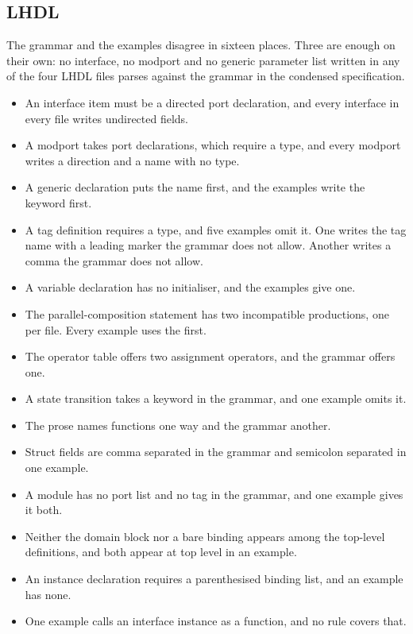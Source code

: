 \subsection{LHDL}

The grammar and the examples disagree in sixteen places. Three are enough on
their own: no interface, no modport and no generic parameter list written in
any of the four LHDL files parses against the grammar in the condensed
specification.

\begin{itemize}
  \item An interface item must be a directed port declaration, and every
        interface in every file writes undirected fields.
  \item A modport takes port declarations, which require a type, and every
        modport writes a direction and a name with no type.
  \item A generic declaration puts the name first, and the examples write
        the keyword first.
  \item A tag definition requires a type, and five examples omit it. One
        writes the tag name with a leading marker the grammar does not
        allow. Another writes a comma the grammar does not allow.
  \item A variable declaration has no initialiser, and the examples give
        one.
  \item The parallel-composition statement has two incompatible
        productions, one per file. Every example uses the first.
  \item The operator table offers two assignment operators, and the grammar
        offers one.
  \item A state transition takes a keyword in the grammar, and one example
        omits it.
  \item The prose names functions one way and the grammar another.
  \item Struct fields are comma separated in the grammar and semicolon
        separated in one example.
  \item A module has no port list and no tag in the grammar, and one
        example gives it both.
  \item Neither the domain block nor a bare binding appears among the
        top-level definitions, and both appear at top level in an example.
  \item An instance declaration requires a parenthesised binding list, and
        an example has none.
  \item One example calls an interface instance as a function, and no rule
        covers that.
\end{itemize}

